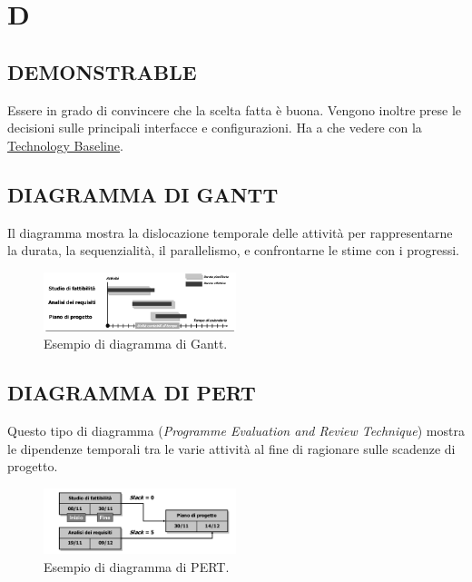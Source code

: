 \newpage
	\flushright{\hyperref[index]{\color{black!65}{Ritorna all'indice}}}\flushleft
	\section{D} \label{sec:D}
	
		\subsection{DEMONSTRABLE}		\label{demonstrable}
		Essere in grado di convincere che la scelta fatta è buona. Vengono inoltre prese le decisioni sulle principali interfacce e configurazioni. Ha  a che vedere con la \underline{\hyperref[technologybaseline]{Technology Baseline}}.
	
		\subsection{DIAGRAMMA DI GANTT}  \label{gantt}
		Il diagramma mostra la dislocazione temporale delle attività per rappresentarne la durata, la sequenzialità, il parallelismo, e confrontarne le stime con i progressi.
		
		\begin{figure}[H]
			\centering
			\includegraphics[width=0.5\textwidth]{img/gantt}		
			\caption{Esempio di diagramma di Gantt.}
		\end{figure} 
	
		\subsection{DIAGRAMMA DI PERT}  \label{pert}
		Questo tipo di diagramma (\textit{Programme Evaluation and Review Technique}) mostra le dipendenze temporali tra le varie attività al fine di ragionare sulle scadenze di progetto.
		
		\begin{figure}[H]
			\centering
			\includegraphics[width=0.5\textwidth]{img/pert}		
			\caption{Esempio di diagramma di PERT.}
		\end{figure} 
		
